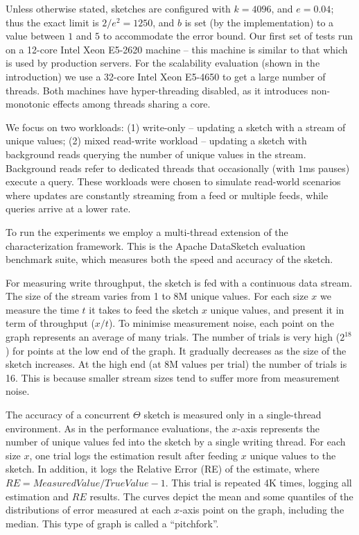Unless otherwise stated, sketches are configured with $k=4096$, and $e=0.04$; thus the exact limit
is $2/e^2=1250$, and $b$ is set (by the implementation) to a value between $1$ and $5$ to accommodate the
error bound. Our first set of tests run on a 12-core Intel Xeon E5-2620 machine -- this machine is similar
to that which is used by production servers. For the scalability evaluation (shown in the introduction) we use a 32-core Intel Xeon
E5-4650 to get a large number of threads. Both machines have hyper-threading disabled, as it introduces
non-monotonic effects among threads sharing a core.

We focus on two workloads: (1) write-only -- updating a sketch with a stream of unique values; (2) mixed
read-write workload -- updating a sketch with background reads querying the number of unique values in
the stream. Background reads refer to dedicated threads that occasionally (with $1$ms pauses) execute a query.
These workloads were chosen to simulate read-world scenarios where updates are constantly streaming from
a feed or multiple feeds, while queries arrive at a lower rate.

To run the experiments we employ a multi-thread extension of the characterization
framework. This is the Apache DataSketch evaluation benchmark suite, which measures
both the speed and accuracy of the sketch. 

For measuring write throughput, the sketch is fed with a continuous data stream. The size of
the stream varies from 1 to 8M unique values. For each size $x$ we measure the time $t$ it takes to feed the
sketch $x$ unique values, and present it in term of throughput ($x/t$). To minimise measurement noise,
each point on the graph represents an average of many trials. The number of trials is very high
($2^{18}$) for points at the low end of the graph. It gradually decreases as the size of the
sketch increases. At the high end (at 8M values per trial) the number of trials is 16. This is because
smaller stream sizes tend to suffer more from measurement noise.

The accuracy of a concurrent $\Theta$ sketch is measured only in a single-thread environment. As
in the performance evaluations, the $x$-axis represents the number of unique values fed into the sketch
by a single writing thread. For each size $x$, one trial logs the estimation result after feeding $x$
unique values to the sketch. In addition, it logs the Relative Error (RE) of the estimate, where
$\mathit{RE} = \mathit{MeasuredValue}/\mathit{TrueValue} - 1$. This trial is repeated 4K times,
logging all estimation and $\mathit{RE}$ results. The curves depict the mean and some
quantiles of the distributions of error measured at each $x$-axis point on the graph, including the median. 
This type of graph is called a ``pitchfork''.


